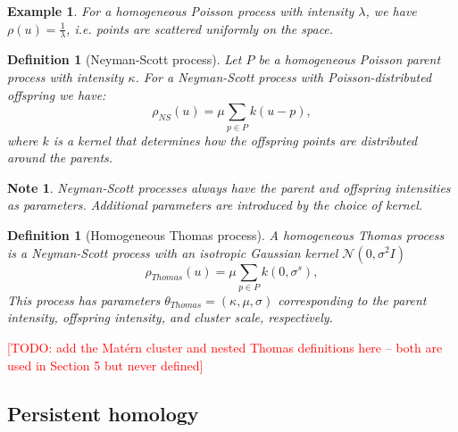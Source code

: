 \documentclass[11pt,letterpaper]{article}
\newcommand{\1}{\mathds{1}}
\newcommand{\kpar}{\kappa}
\newcommand{\mo}{\mu}
\newcommand{\todo}[1]{\textcolor{red}{[TODO: #1]}}
\newcommand{\todo}[1]{}
\theoremstyle{plain}
\theoremstyle{definitioncolon}
\newtheorem{definition}[theorem]{Definition}
\newtheorem*{note}{Note}
\newtheorem*{example}{Example}
\begin{document}
    \begin{example}
        For a homogeneous Poisson process with intensity $\lambda$, we have
        $\rho(u) = \frac{1}{\lambda}$, i.e. points are scattered uniformly on
        the space.
    \end{example}

    \begin{definition}[Neyman-Scott process]
        Let $P$ be a homogeneous Poisson \emph{parent} process with intensity
        $\kpar$. For a Neyman-Scott process with Poisson-distributed offspring
        we have:
            \[
            \rho_{NS}(u) = \mo \sum_{p \in P} k(u - p),
            \]
        where $k$ is a kernel that determines how the \emph{offspring} points
        are distributed around the parents.
    \end{definition}

    \begin{note}
        Neyman-Scott processes always have the parent and offspring intensities
        as parameters. Additional parameters are introduced by the choice of
        kernel.
    \end{note}

    \begin{definition}[Homogeneous Thomas process]
        A homogeneous Thomas process is a Neyman-Scott process with an isotropic
        Gaussian kernel $\mathcal{N}(0, \sigma^2I)$
            \[
            \rho_{Thomas}(u) = \mo \sum_{p \in P} k(0, \sigma^s),
            \]
        This process has parameters $\theta_{Thomas} = (\kappa, \mu, \sigma)$
        corresponding to the parent intensity, offspring intensity, and cluster
        scale, respectively.
    \end{definition}

\todo{add the Mat\'ern cluster and nested Thomas definitions here -- both are
used in Section 5 but never defined}

\subsection{Persistent homology}
\label{ssec:persistence}
\end{document}

